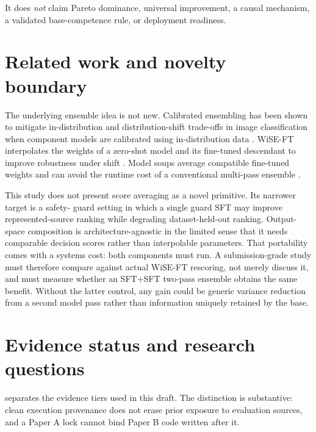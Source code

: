 \documentclass[11pt]{article}
\begin{document}
It does \emph{not} claim Pareto dominance, universal improvement, a causal mechanism, a validated
base-competence rule, or deployment readiness.

\section{Related work and novelty boundary}
\label{sec:related}

The underlying ensemble idea is not new.  Calibrated ensembling has been shown to mitigate
in-distribution and distribution-shift trade-offs in image classification when component models
are calibrated using in-distribution data \citep{kumar2022calibrated}.  WiSE-FT interpolates the
weights of a zero-shot model and its fine-tuned descendant to improve robustness under shift
\citep{wortsman2022wiseft}.  Model soups average compatible fine-tuned weights and can avoid the
runtime cost of a conventional multi-pass ensemble \citep{wortsman2022modelsoups}.

This study does not present score averaging as a novel primitive.  Its narrower target is a safety-
guard setting in which a single guard SFT may improve represented-source ranking while degrading
dataset-held-out ranking.  Output-space composition is architecture-agnostic in the limited sense
that it needs comparable decision scores rather than interpolable parameters.  That portability
comes with a systems cost: both components must run.  A submission-grade study must therefore
compare against actual WiSE-FT rescoring, not merely discuss it, and must measure whether an
SFT+SFT two-pass ensemble obtains the same benefit.  Without the latter control, any gain could be
generic variance reduction from a second model pass rather than information uniquely retained by
the base.

\section{Evidence status and research questions}
\label{sec:status}

 separates the evidence tiers used in this draft.  The distinction is
substantive: clean execution provenance does not erase prior exposure to evaluation sources, and a
Paper A lock cannot bind Paper B code written after it.
\end{document}
